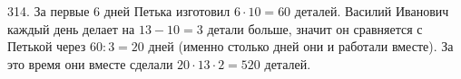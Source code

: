 314. За первые 6 дней Петька изготовил $6\cdot10=60$ деталей. Василий Иванович каждый день делает на $13-10=3$ детали больше, значит он сравняется с Петькой через $60:3=20$ дней (именно столько дней они и работали вместе). За это время они вместе сделали $20\cdot13\cdot2=520$ деталей.\\
